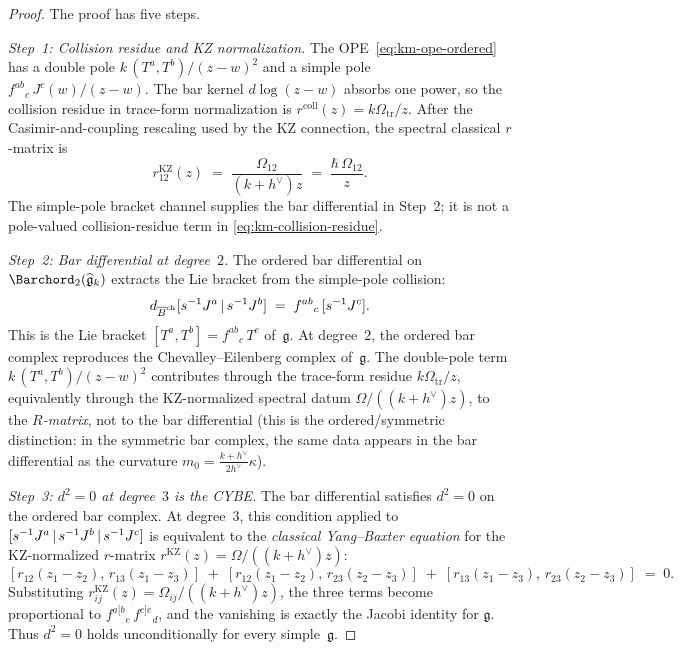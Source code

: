 \begin{proof}
The proof has five steps.

\emph{Step~1: Collision residue and KZ normalization.}
The OPE~\eqref{eq:km-ope-ordered} has a double pole
$k\,(T^a,T^b)/(z-w)^2$ and a simple pole
$f^{ab}{}_{c}\,J^c(w)/(z-w)$. The bar kernel
$d\log(z-w)$ absorbs one power, so the collision
residue in trace-form normalization is
$r^{\mathrm{coll}}(z)=k\Omega_{\mathrm{tr}}/z$. After the
Casimir-and-coupling rescaling used by the KZ connection, the spectral
classical $r$-matrix is
\begin{equation}\label{eq:km-collision-residue}
r^{\mathrm{KZ}}_{12}(z)
\;=\;
\frac{\Omega_{12}}{(k+h^\vee)z}
\;=\;
\frac{\hbar\,\Omega_{12}}{z}.
\end{equation}
The simple-pole bracket channel supplies the bar differential in
Step~2; it is not a pole-valued collision-residue term in
\eqref{eq:km-collision-residue}.

\emph{Step~2: Bar differential at degree~$2$.}
The ordered bar differential on
$\Barchord_2(\widehat{\mathfrak{g}}_k)$ extracts
the Lie bracket from the simple-pole collision:
\begin{equation}\label{eq:km-bar-d2}
d_{\overline{B}^{\mathrm{ch}}}[s^{-1}J^a \,|\, s^{-1}J^b]
\;=\;
f^{ab}{}_{c}\,[s^{-1}J^c].
\end{equation}
This is the Lie bracket $[T^a, T^b] = f^{ab}{}_{c}\,T^c$
of~$\mathfrak{g}$. At degree~$2$, the ordered bar complex
reproduces the Chevalley--Eilenberg complex
of~$\mathfrak{g}$. The double-pole term
$k\,(T^a,T^b)/(z-w)^2$ contributes through the trace-form residue
$k\Omega_{\mathrm{tr}}/z$, equivalently through the KZ-normalized
spectral datum $\Omega/((k+h^\vee)z)$, to the \emph{$R$-matrix}, not
to the bar differential (this is the ordered/symmetric
distinction: in the symmetric bar complex, the same data
appears in the bar differential as the curvature
$m_0 = \frac{k+h^\vee}{2h^\vee}\kappa$).

\emph{Step~3: $d^2=0$ at degree~$3$ is the CYBE.}
The bar differential satisfies $d^2 = 0$ on the ordered bar
complex. At degree~$3$, this condition applied to
$[s^{-1}J^a \,|\, s^{-1}J^b \,|\, s^{-1}J^c]$
is equivalent to the \emph{classical Yang--Baxter equation}
for the KZ-normalized $r$-matrix
$r^{\mathrm{KZ}}(z)=\Omega/((k+h^\vee)z)$:
\begin{equation}\label{eq:cybe}
[r_{12}(z_1{-}z_2),\, r_{13}(z_1{-}z_3)]
\;+\;
[r_{12}(z_1{-}z_2),\, r_{23}(z_2{-}z_3)]
\;+\;
[r_{13}(z_1{-}z_3),\, r_{23}(z_2{-}z_3)]
\;=\; 0.
\end{equation}
Substituting
$r^{\mathrm{KZ}}_{ij}(z)=\Omega_{ij}/((k+h^\vee)z)$, the three
terms become proportional to $f^{a[b}{}_{e}\,f^{c]e}{}_{d}$,
and the vanishing is exactly the Jacobi identity for
$\mathfrak{g}$. Thus $d^2=0$ holds unconditionally for every
simple~$\mathfrak{g}$.


\end{proof}
